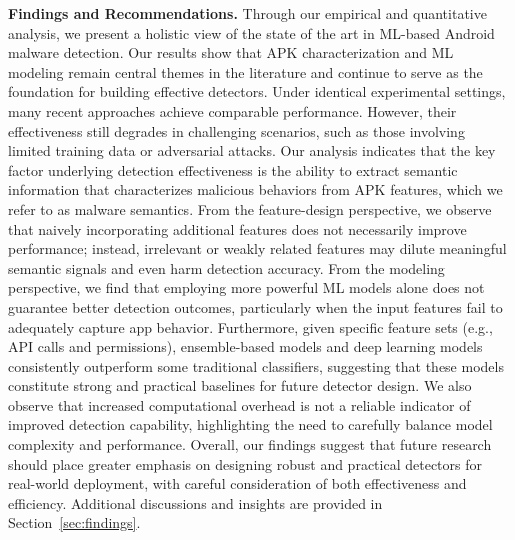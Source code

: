 \noindent \textbf{Findings and Recommendations.} Through our empirical and quantitative analysis, we present a holistic view of the state of the art in ML-based Android malware detection.
Our results show that APK characterization and ML modeling remain central themes in the literature and continue to serve as the foundation for building effective detectors.
Under identical experimental settings, many recent approaches achieve comparable performance.
However, their effectiveness still degrades in challenging scenarios, such as those involving limited training data or adversarial attacks.
Our analysis indicates that the key factor underlying detection effectiveness is the ability to extract semantic information that characterizes malicious behaviors from APK features, which we refer to as malware semantics.
From the feature-design perspective, we observe that naively incorporating additional features does not necessarily improve performance; instead, irrelevant or weakly related features may dilute meaningful semantic signals and even harm detection accuracy.
From the modeling perspective, we find that employing more powerful ML models alone does not guarantee better detection outcomes, particularly when the input features fail to adequately capture app behavior.
Furthermore, given specific feature sets (e.g., API calls and permissions), ensemble-based models and deep learning models consistently outperform some traditional classifiers, suggesting that these models constitute strong and practical baselines for future detector design.
We also observe that increased computational overhead is not a reliable indicator of improved detection capability, highlighting the need to carefully balance model complexity and performance.
Overall, our findings suggest that future research should place greater emphasis on designing robust and practical detectors for real-world deployment, with careful consideration of both effectiveness and efficiency.
Additional discussions and insights are provided in Section~\ref{sec:findings}.

